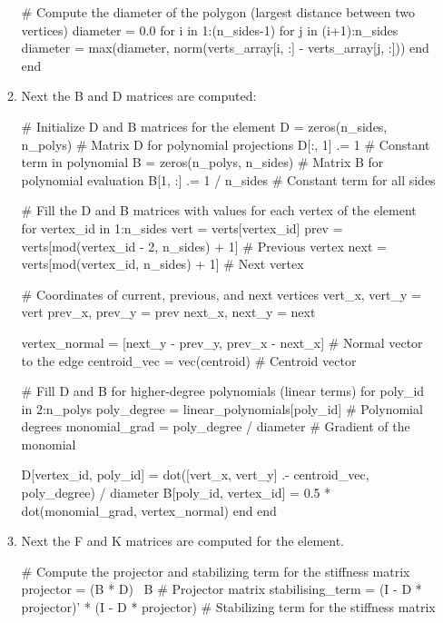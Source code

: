\documentclass{report}
\begin{document}
\begin{enumerate}
\begin{enumerate}
\begin{jllisting}[style=JuliaStyle]
            # Compute the diameter of the polygon (largest distance between two vertices)
            diameter = 0.0
            for i in 1:(n_sides-1)
                for j in (i+1):n_sides
                    diameter = max(diameter, norm(verts_array[i, :] - verts_array[j, :]))
                end
            end
        \end{jllisting}

        \item Next the B and D matrices are computed:
        \begin{jllisting}[style=JuliaStyle]
        # Initialize D and B matrices for the element
        D = zeros(n_sides, n_polys)  # Matrix D for polynomial projections
        D[:, 1] .= 1  # Constant term in polynomial
        B = zeros(n_polys, n_sides)  # Matrix B for polynomial evaluation
        B[1, :] .= 1 / n_sides  # Constant term for all sides
        
        # Fill the D and B matrices with values for each vertex of the element
        for vertex_id in 1:n_sides
            vert = verts[vertex_id]
            prev = verts[mod(vertex_id - 2, n_sides) + 1]  # Previous vertex
            next = verts[mod(vertex_id, n_sides) + 1]  # Next vertex
        
            # Coordinates of current, previous, and next vertices
            vert_x, vert_y = vert
            prev_x, prev_y = prev
            next_x, next_y = next
        
            vertex_normal = [next_y - prev_y, prev_x - next_x]  # Normal vector to the edge
            centroid_vec = vec(centroid)  # Centroid vector
        
            # Fill D and B for higher-degree polynomials (linear terms)
            for poly_id in 2:n_polys
                poly_degree = linear_polynomials[poly_id]  # Polynomial degrees
                monomial_grad = poly_degree / diameter  # Gradient of the monomial
        
                D[vertex_id, poly_id] = dot([vert_x, vert_y] .- centroid_vec, poly_degree) / diameter
                B[poly_id, vertex_id] = 0.5 * dot(monomial_grad, vertex_normal)
            end
        end
        \end{jllisting}

        \item Next the F and K matrices are computed for the element.
        \begin{jllisting}[style=JuliaStyle]
                # Compute the projector and stabilizing term for the stiffness matrix
                projector = (B * D) \ B  # Projector matrix
                stabilising_term = (I - D * projector)' * (I - D * projector)  # Stabilizing term for the stiffness matrix
        

\end{jllisting}
\end{enumerate}
\end{enumerate}
\end{document}
